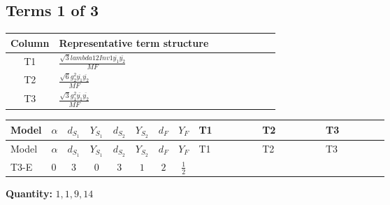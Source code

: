 \documentclass[8pt]{article}
\begin{document}
\begin{landscape}
\subsection*{Terms 1 of 3}
\begin{center}
\begin{tabular}{@{}c >{\raggedright\arraybackslash}p{0.82\linewidth}@{}}
\toprule
Column & Representative term structure \\
\midrule
T1 & \(\displaystyle \frac{\sqrt{3} lambda12Inv1 \overline{y_{1}} \overline{y_{2}}}{MF}\) \\
\midrule
T2 & \(\displaystyle \frac{\sqrt{6} g_{2}^{2} \overline{y_{1}} \overline{y_{2}}}{MF}\) \\
\midrule
T3 & \(\displaystyle \frac{\sqrt{3} g_{1}^{2} \overline{y_{1}} \overline{y_{2}}}{MF}\) \\
\midrule
\bottomrule
\end{tabular}
\end{center}
\smallskip
\tiny
\begin{longtable}{@{}llcccccc >{\raggedright\arraybackslash}p{0.21\linewidth} >{\raggedright\arraybackslash}p{0.21\linewidth} >{\raggedright\arraybackslash}p{0.21\linewidth}@{}}
\toprule
Model & $\alpha$ & $d_{S_1}$ & $Y_{S_1}$ & $d_{S_2}$ & $Y_{S_2}$ & $d_F$ & $Y_F$ & T1 & T2 & T3 \\
\midrule
\endfirsthead
\toprule
Model & $\alpha$ & $d_{S_1}$ & $Y_{S_1}$ & $d_{S_2}$ & $Y_{S_2}$ & $d_F$ & $Y_F$ & T1 & T2 & T3 \\
\midrule
\endhead
T3-E & $0$ & $3$ & $0$ & $3$ & $1$ & $2$ & $\frac{1}{2}$ & \scriptsize\adjustbox{max width=\linewidth}{$\begin{gathered} - \frac{\sqrt{3} lambda12Inv1 \overline{y_{1}} \overline{y_{2}}}{6 MF}\end{gathered}$} & \scriptsize\adjustbox{max width=\linewidth}{$\begin{gathered} \frac{\sqrt{6} g_{2}^{2} \overline{y_{1}} \overline{y_{2}}}{3 MF}\end{gathered}$} & \scriptsize\adjustbox{max width=\linewidth}{$\begin{gathered} \frac{\sqrt{3} g_{1}^{2} \overline{y_{1}} \overline{y_{2}}}{8 MF}\end{gathered}$} \\
\midrule
\bottomrule
\end{longtable}
\clearpage
\noindent\textbf{Quantity: }$\mathrm{1,1,9,14}$\par\smallskip

\end{landscape}
\end{document}
